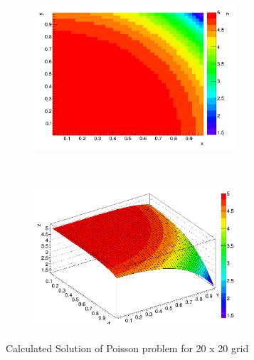 \documentclass[paper=a4, fontsize=11pt, abstract=on]{scrartcl}
\numberwithin{equation}{section}		%
\numberwithin{figure}{section}			%
\numberwithin{table}{section}				%
\begin{document}
\begin{figure}[H]
        \centering
        \begin{subfigure}[h]{0.5\textwidth}
                \includegraphics[width = 7.5cm]{p1}
                \caption{}
				
        \end{subfigure}%
       ~~~~~
        \begin{subfigure}[h]{0.5\textwidth}
                \includegraphics[width = 7.5cm]{p2}
                \caption{}
                
        \end{subfigure}
        \caption{Calculated Solution of Poisson problem for 20 x 20 grid}
        \label{ps}
\end{figure}
\end{document}
